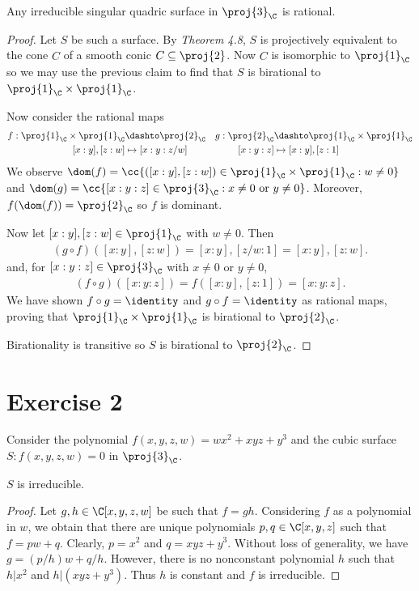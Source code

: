 \documentclass{article}
\begin{document}
\begin{claim*}[2]
  Any irreducible singular quadric surface in $\proj{3}_{\C}$ is rational.
  \begin{proof}
    Let $S$ be such a surface. By \emph{Theorem 4.8}, $S$ is projectively equivalent
    to the cone $\widehat C$ of a smooth conic $C\subseteq\proj{2}$. Now $C$ is isomorphic
    to $\proj{1}_{\C}$ so we may use the previous claim to find that $S$ is birational
    to $\proj{1}_{\C}\times\proj{1}_{\C}$.

    Now consider the rational maps
    \begin{align*}
      f : \proj{1}_{\C}\times\proj{1}_{\C} &\dashto \proj{2}_{\C} &
      g : \proj{2}_{\C} &\dashto \proj{1}_{\C}\times\proj{1}_{\C} \\
      [x:y],[z:w] &\mapsto [x:y:z/w] &
      [x:y:z] &\mapsto [x:y],[z:1]
    \end{align*}
    We observe $\dom(f)=\cc{([x:y],[z:w])\in\proj{1}_{\C}\times\proj{1}_{\C} : w \neq 0}$
    and $\dom(g) = \cc{[x:y:z] \in\proj{3}_{\C} : x \neq 0 \text{ or }y\neq 0}$. Moreover,
    $f(\dom(f))=\proj{2}_{\C}$ so $f$ is dominant.

    Now let $[x:y],[z:w]\in\proj{1}_{\C}$ with $w\neq 0$. Then
    \begin{align*}
      (g\circ f)([x:y],[z:w]) = [x:y],[z/w : 1] = [x:y],[z:w].
    \end{align*}
    and, for $[x:y:z]\in\proj{3}_{\C}$ with $x\neq 0$ or $y\neq 0$,
    \begin{align*}
      (f\circ g)([x:y:z]) = f([x:y],[z:1]) = [x:y:z].
    \end{align*}
    We have shown $f\circ g = \identity$ and $g\circ f=\identity$ as rational maps,
    proving that $\proj{1}_{\C}\times\proj{1}_{\C}$ is birational to $\proj{2}_{\C}$.

    Birationality is transitive so $S$ is birational to $\proj{2}_{\C}$.
  \end{proof}
\end{claim*}

\section*{Exercise 2}

Consider the polynomial $f(x,y,z,w)=wx^2 + xyz + y^3$ and the cubic surface
$S:f(x,y,z,w) = 0$ in $\proj{3}_{\C}$.

\begin{claim*}[1a]
  $S$ is irreducible.
  \begin{proof}
    Let $g,h\in\C[x,y,z,w]$ be such that $f=gh$. Considering $f$ as a polynomial in $w$,
    we obtain that there are unique polynomials $p,q\in\C[x,y,z]$ such that
    $f=p w + q$. Clearly, $p=x^2$ and $q = xyz + y^3$. Without loss of generality, we
    have $g = (p/h) w + q/h$. However, there is no nonconstant polynomial $h$ such that
    $h | x^2$ and $h | (xyz + y^3)$. Thus $h$ is constant and $f$ is irreducible.
  \end{proof}
\end{claim*}
\end{document}
